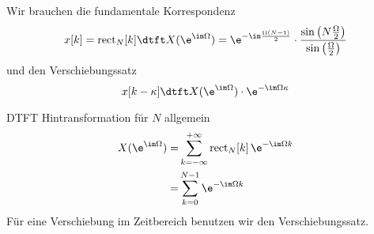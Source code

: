 \begin{Werkzeug}
Wir brauchen die fundamentale Korrespondenz
\begin{equation}
x[k] = \mathrm{rect}_N[k]
\dtft
X(\e^{\im\Omega})=\e^{-\im\frac{\Omega(N-1)}{2}}\cdot\frac{\sin\left(N\frac{\Omega}{2}\right)}{\sin\left(\frac{\Omega}{2}\right)}
\end{equation}
und den Verschiebungssatz
\begin{equation}
x[k-\kappa]
\dtft
X(\e^{\im\Omega}) \cdot \e^{-\im\Omega\kappa}
\end{equation}
\end{Werkzeug}
\begin{Ansatz}
DTFT Hintransformation für $N$ allgemein
\begin{align}
X(\e^{\im\Omega})
=& \sum_{k=-\infty}^{+\infty} \mathrm{rect}_N[k] \, \e^{-\im\Omega k}\\
=& \sum_{k=0}^{N-1} \e^{-\im\Omega k}
\end{align}
Für eine Verschiebung im Zeitbereich benutzen wir den Verschiebungssatz.
\end{Ansatz}
